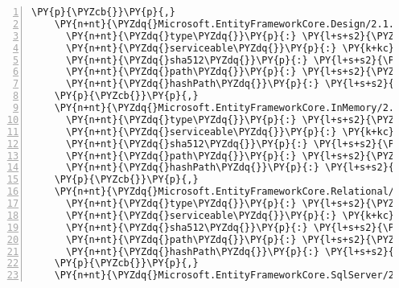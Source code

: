 \begin{Verbatim}[commandchars=\\\{\},numbers=left,firstnumber=1,stepnumber=1,numberblanklines=0]
    \PY{p}{\PYZcb{}}\PY{p}{,}
    \PY{n+nt}{\PYZdq{}Microsoft.EntityFrameworkCore.Design/2.1.0\PYZhy{}rc1\PYZhy{}final\PYZdq{}}\PY{p}{:} \PY{p}{\PYZob{}}
      \PY{n+nt}{\PYZdq{}type\PYZdq{}}\PY{p}{:} \PY{l+s+s2}{\PYZdq{}package\PYZdq{}}\PY{p}{,}
      \PY{n+nt}{\PYZdq{}serviceable\PYZdq{}}\PY{p}{:} \PY{k+kc}{true}\PY{p}{,}
      \PY{n+nt}{\PYZdq{}sha512\PYZdq{}}\PY{p}{:} \PY{l+s+s2}{\PYZdq{}sha512\PYZhy{}MynDVj9zedXD2vKNfZjzMqVyiN9nIz8R/zIe/9llaLxQ20P9W3kAsUczNjW7I/yxWjI3Gs5rIYAfwp4MsIhung==\PYZdq{}}\PY{p}{,}
      \PY{n+nt}{\PYZdq{}path\PYZdq{}}\PY{p}{:} \PY{l+s+s2}{\PYZdq{}microsoft.entityframeworkcore.design/2.1.0\PYZhy{}rc1\PYZhy{}final\PYZdq{}}\PY{p}{,}
      \PY{n+nt}{\PYZdq{}hashPath\PYZdq{}}\PY{p}{:} \PY{l+s+s2}{\PYZdq{}microsoft.entityframeworkcore.design.2.1.0\PYZhy{}rc1\PYZhy{}final.nupkg.sha512\PYZdq{}}
    \PY{p}{\PYZcb{}}\PY{p}{,}
    \PY{n+nt}{\PYZdq{}Microsoft.EntityFrameworkCore.InMemory/2.1.0\PYZhy{}rc1\PYZhy{}final\PYZdq{}}\PY{p}{:} \PY{p}{\PYZob{}}
      \PY{n+nt}{\PYZdq{}type\PYZdq{}}\PY{p}{:} \PY{l+s+s2}{\PYZdq{}package\PYZdq{}}\PY{p}{,}
      \PY{n+nt}{\PYZdq{}serviceable\PYZdq{}}\PY{p}{:} \PY{k+kc}{true}\PY{p}{,}
      \PY{n+nt}{\PYZdq{}sha512\PYZdq{}}\PY{p}{:} \PY{l+s+s2}{\PYZdq{}sha512\PYZhy{}RBN1X9Oyf7CIdRfHKzNRuSSH/Ffata3BdKnOFlobNozXBDYHfXi6oKVGVMKQnKcAJV252XaI467mpoA0FOqvUg==\PYZdq{}}\PY{p}{,}
      \PY{n+nt}{\PYZdq{}path\PYZdq{}}\PY{p}{:} \PY{l+s+s2}{\PYZdq{}microsoft.entityframeworkcore.inmemory/2.1.0\PYZhy{}rc1\PYZhy{}final\PYZdq{}}\PY{p}{,}
      \PY{n+nt}{\PYZdq{}hashPath\PYZdq{}}\PY{p}{:} \PY{l+s+s2}{\PYZdq{}microsoft.entityframeworkcore.inmemory.2.1.0\PYZhy{}rc1\PYZhy{}final.nupkg.sha512\PYZdq{}}
    \PY{p}{\PYZcb{}}\PY{p}{,}
    \PY{n+nt}{\PYZdq{}Microsoft.EntityFrameworkCore.Relational/2.1.0\PYZhy{}rc1\PYZhy{}final\PYZdq{}}\PY{p}{:} \PY{p}{\PYZob{}}
      \PY{n+nt}{\PYZdq{}type\PYZdq{}}\PY{p}{:} \PY{l+s+s2}{\PYZdq{}package\PYZdq{}}\PY{p}{,}
      \PY{n+nt}{\PYZdq{}serviceable\PYZdq{}}\PY{p}{:} \PY{k+kc}{true}\PY{p}{,}
      \PY{n+nt}{\PYZdq{}sha512\PYZdq{}}\PY{p}{:} \PY{l+s+s2}{\PYZdq{}sha512\PYZhy{}XOP+P5FMVV1Rj86h7ezUT+eysExLzHTtQIth7pO93Z9A11kKQdiMCsDsRsCqkSz8FRovQthVMKB5xj6pgIAT6A==\PYZdq{}}\PY{p}{,}
      \PY{n+nt}{\PYZdq{}path\PYZdq{}}\PY{p}{:} \PY{l+s+s2}{\PYZdq{}microsoft.entityframeworkcore.relational/2.1.0\PYZhy{}rc1\PYZhy{}final\PYZdq{}}\PY{p}{,}
      \PY{n+nt}{\PYZdq{}hashPath\PYZdq{}}\PY{p}{:} \PY{l+s+s2}{\PYZdq{}microsoft.entityframeworkcore.relational.2.1.0\PYZhy{}rc1\PYZhy{}final.nupkg.sha512\PYZdq{}}
    \PY{p}{\PYZcb{}}\PY{p}{,}
    \PY{n+nt}{\PYZdq{}Microsoft.EntityFrameworkCore.SqlServer/2.1.0\PYZhy{}rc1\PYZhy{}final\PYZdq{}}\PY{p}{:} \PY{p}{\PYZob{}}

\end{Verbatim}
